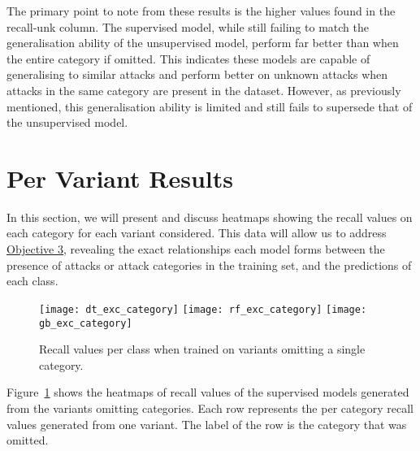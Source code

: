 The primary point to note from these results is the higher values found in the
recall-unk column. The supervised model, while still failing to match the
generalisation ability of the unsupervised model, perform far better than when
the entire category if omitted. This indicates these models are capable of
generalising to similar attacks and perform better on unknown attacks when
attacks in the same category are present in the dataset. However, as previously
mentioned, this generalisation ability is limited and still fails to supersede
that of the unsupervised model.

\section{Per Variant Results}%
\label{sec:res_var}

In this section, we will present and discuss heatmaps showing the recall values
on each category for each variant considered. This data will allow us to
address \hyperlink{obj}{Objective 3}, revealing the exact relationships each
model forms between the presence of attacks or attack categories in the
training set, and the predictions of each class.

%
\begin{figure}[htbp]
    \centering
    \texttt{[image: dt\_exc\_category]}
    \texttt{[image: rf\_exc\_category]}
    \texttt{[image: gb\_exc\_category]}
    \caption[Category Omission Results]{Recall values per class when trained on variants omitting a single category.\label{fig:exc_cat}}
\end{figure}
% 
Figure~\ref{fig:exc_cat} shows the heatmaps of recall values of the supervised
models generated from the variants omitting categories. Each row represents the
per category recall values generated from one variant. The label of the row is
the category that was omitted.

